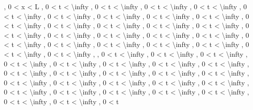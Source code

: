 \documentclass[
]{article}
\begin{document}
{, 0 \textless{} x \textless{} L , 0 \textless{} t \textless{}
\textbackslash infty , 0 \textless{} t \textless{} \textbackslash infty
, 0 \textless{} t \textless{} \textbackslash infty , 0 \textless{} t
\textless{} \textbackslash infty , 0 \textless{} t \textless{}
\textbackslash infty , 0 \textless{} t \textless{} \textbackslash infty
, 0 \textless{} t \textless{} \textbackslash infty , 0 \textless{} t
\textless{} \textbackslash infty , 0 \textless{} t \textless{}
\textbackslash infty , 0 \textless{} t \textless{} \textbackslash infty
, 0 \textless{} t \textless{} \textbackslash infty , 0 \textless{} t
\textless{} \textbackslash infty , 0 \textless{} t \textless{}
\textbackslash infty , 0 \textless{} t \textless{} \textbackslash infty
, 0 \textless{} t \textless{} \textbackslash infty , 0 \textless{} t
\textless{} \textbackslash infty , 0 \textless{} t \textless{}
\textbackslash infty , 0 \textless{} t \textless{} \textbackslash infty
, 0 \textless{} t \textless{} \textbackslash infty , 0 \textless{} t
\textless{} \textbackslash infty , 0 \textless{} t \textless{}
\textbackslash infty , 0 \textless{} t \textless{} \textbackslash infty
, 0 \textless{} t \textless{} \textbackslash infty , 0 \textless{} t
\textless{} \textbackslash infty , 0 \textless{} t \textless{}
\textbackslash infty , 0 \textless{} t \textless{} \textbackslash infty
, , 0 \textless{} t \textless{} \textbackslash infty , 0 \textless{} t
\textless{} \textbackslash infty , 0 \textless{} t \textless{}
\textbackslash infty , 0 \textless{} t \textless{} \textbackslash infty
, 0 \textless{} t \textless{} \textbackslash infty , 0 \textless{} t
\textless{} \textbackslash infty , 0 \textless{} t \textless{}
\textbackslash infty , 0 \textless{} t \textless{} \textbackslash infty
, 0 \textless{} t \textless{} \textbackslash infty , 0 \textless{} t
\textless{} \textbackslash infty , 0 \textless{} t \textless{}
\textbackslash infty , 0 \textless{} t \textless{} \textbackslash infty
, 0 \textless{} t \textless{} \textbackslash infty , 0 \textless{} t
\textless{} \textbackslash infty , 0 \textless{} t \textless{}
\textbackslash infty , 0 \textless{} t \textless{} \textbackslash infty
, 0 \textless{} t \textless{} \textbackslash infty , 0 \textless{} t
\textless{} \textbackslash infty , 0 \textless{} t \textless{}
\textbackslash infty , 0 \textless{} t \textless{} \textbackslash infty
, 0 \textless{} t \textless{} \textbackslash infty , 0 \textless{} t
\textless{} \textbackslash infty , 0 \textless{} t \textless{}
\textbackslash infty , 0 \textless{} t \textless{} \textbackslash infty
, 0 \textless{} t \textless{} \textbackslash infty , 0 \textless{} t
}
\end{document}
